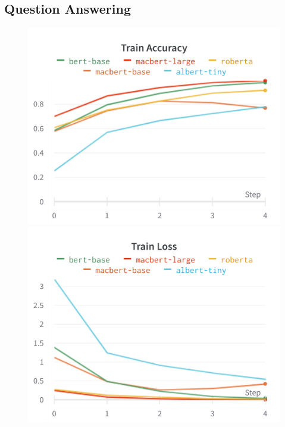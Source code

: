 \documentclass{homeworg}
\begin{document}
\subsection{Question Answering}
\begin{figure}[!htb]
\includegraphics[width=\linewidth]{charts/Section-9-Panel-0-ic193coho}

\endminipage\hfill
{}
\includegraphics[width=\linewidth]{charts/Section-9-Panel-3-ssfbx70xn}

\endminipage
\end{figure}
\end{document}
